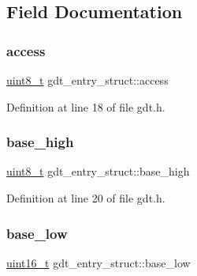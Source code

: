 \subsection{Field Documentation}
\mbox{\label{a00142_ac07173385496c5b952e58ddc20f1cc99_ac07173385496c5b952e58ddc20f1cc99}} 
\subsubsection{\texorpdfstring{access}{access}}
{\footnotesize\ttfamily \hyperlink{a00092_aba7bc1797add20fe3efdf37ced1182c5_aba7bc1797add20fe3efdf37ced1182c5}{uint8\+\_\+t} gdt\+\_\+entry\+\_\+struct\+::access}



Definition at line 18 of file gdt.\+h.

\mbox{\label{a00142_aa08eedea9c0f707b9fa052b7567879c7_aa08eedea9c0f707b9fa052b7567879c7}} 
\subsubsection{\texorpdfstring{base\+\_\+high}{base\_high}}
{\footnotesize\ttfamily \hyperlink{a00092_aba7bc1797add20fe3efdf37ced1182c5_aba7bc1797add20fe3efdf37ced1182c5}{uint8\+\_\+t} gdt\+\_\+entry\+\_\+struct\+::base\+\_\+high}



Definition at line 20 of file gdt.\+h.

\mbox{\label{a00142_adba88eafea5f07167d181e4090cbcf49_adba88eafea5f07167d181e4090cbcf49}} 
\subsubsection{\texorpdfstring{base\+\_\+low}{base\_low}}
{\footnotesize\ttfamily \hyperlink{a00092_a273cf69d639a59973b6019625df33e30_a273cf69d639a59973b6019625df33e30}{uint16\+\_\+t} gdt\+\_\+entry\+\_\+struct\+::base\+\_\+low}



